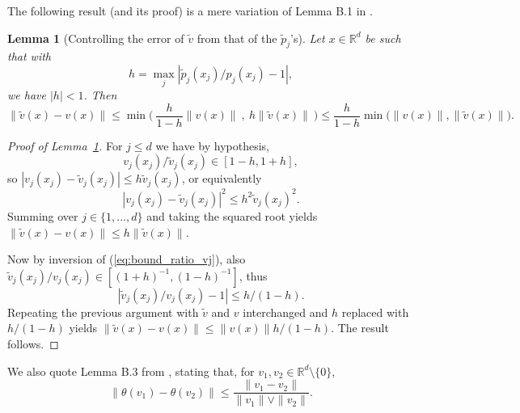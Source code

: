 \documentclass{article}
\numberwithin{equation}{section}
\newtheorem{lemma}{Lemma}[section]
\newcommand{\rset}{\mathbb{R}}
\begin{document}
The following result  (and its proof) is a mere variation of Lemma B.1 in \cite{ClemenconJalalzaiSabourinSegers2023}.
 \begin{lemma}[Controlling the error of $\tilde v$ from that of the $\tilde{ p}_j$'s]\label{lem:control_err_v_from_err_pj}
  Let  $x\in\rset^d$ be such that with  
   $$
h = \max_j |\tilde{ p}_j(x_j)/ p_j(x_j) - 1| , 
$$
we have $|h|<1$. Then
$$
\| \tilde v(x) - v(x) \|\le \min\Big(~ \frac{h}{1-h} \| v(x) \|~,~ h\| \tilde v(x)\|~\Big) \le \frac{h}{1-h} \min\big( \| v(x) \|, \| \tilde v(x) \|\big) . 
$$
  \end{lemma}
  \begin{proof}[Proof of Lemma~\ref{lem:control_err_v_from_err_pj}]
    For $j\le d$ we have by hypothesis,
    \begin{equation}\label{eq:bound_ratio_vj}
        v_j(x_j)/\tilde{v}_j(x_j)  \in[1-h, 1+h],
    \end{equation}
    so $
    |{v}_j(x_j) - \tilde{v}_j(x_j) | \le h \tilde{v}_j(x_j)
    $, or equivalently
    $$
    |{v}_j(x_j) - \tilde{v}_j(x_j) |^2 \le h^2  \tilde{v}_j(x_j)^2.
    $$
    Summing over $j\in\{1,\ldots, d\}$ and taking the squared root yields
    $\| \tilde v(x) - v(x) \|\le   h \| \tilde v(x) \| $.

    Now  by inversion of (\ref{eq:bound_ratio_vj}), also
    $ \tilde{v}_j(x_j)/{v}_j(x_j)  \in[(1+h)^{-1}, (1-h)^{-1}]$, thus
    $$
    |\tilde{v}_j(x_j)/{v}_j(x_j) -1 | \le h/(1-h).
    $$ Repeating the previous argument with $\tilde v $ and $v$
    interchanged and $h$ replaced with $h/(1-h)$ yields %
    $\| \tilde v(x) - v(x) \|\le  \| v(x) \| h/(1-h)$.
    The result follows.
\end{proof}

We also quote Lemma B.3 from
\cite{ClemenconJalalzaiSabourinSegers2023}, stating that, for
$v_1,v_2\in\rset^d\setminus\{0\}$,
\begin{equation}
    \label{eq:control_theta_from_vect}
    \|\theta(v_1) - \theta(v_2) \|\le \frac{ \|v_1-v_2\|}{\|v_1\|\vee \|v_2\|}.
\end{equation}
\end{document}
